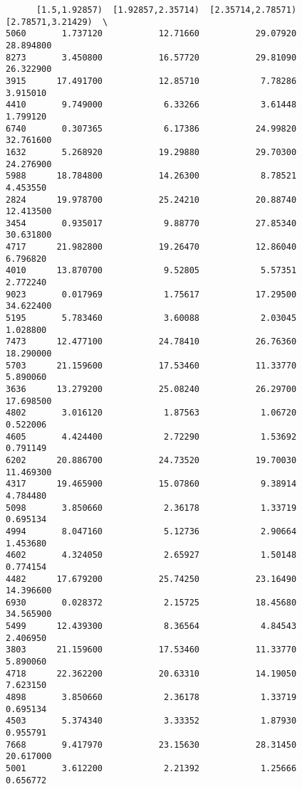 \documentclass[11pt]{article}
\begin{document}
\begin{verbatim}
      [1.5,1.92857)  [1.92857,2.35714)  [2.35714,2.78571)  [2.78571,3.21429)  \
5060       1.737120           12.71660           29.07920          28.894800   
8273       3.450800           16.57720           29.81090          26.322900   
3915      17.491700           12.85710            7.78286           3.915010   
4410       9.749000            6.33266            3.61448           1.799120   
6740       0.307365            6.17386           24.99820          32.761600   
1632       5.268920           19.29880           29.70300          24.276900   
5988      18.784800           14.26300            8.78521           4.453550   
2824      19.978700           25.24210           20.88740          12.413500   
3454       0.935017            9.88770           27.85340          30.631800   
4717      21.982800           19.26470           12.86040           6.796820   
4010      13.870700            9.52805            5.57351           2.772240   
9023       0.017969            1.75617           17.29500          34.622400   
5195       5.783460            3.60088            2.03045           1.028800   
7473      12.477100           24.78410           26.76360          18.290000   
5703      21.159600           17.53460           11.33770           5.890060   
3636      13.279200           25.08240           26.29700          17.698500   
4802       3.016120            1.87563            1.06720           0.522006   
4605       4.424400            2.72290            1.53692           0.791149   
6202      20.886700           24.73520           19.70030          11.469300   
4317      19.465900           15.07860            9.38914           4.784480   
5098       3.850660            2.36178            1.33719           0.695134   
4994       8.047160            5.12736            2.90664           1.453680   
4602       4.324050            2.65927            1.50148           0.774154   
4482      17.679200           25.74250           23.16490          14.396600   
6930       0.028372            2.15725           18.45680          34.565900   
5499      12.439300            8.36564            4.84543           2.406950   
3803      21.159600           17.53460           11.33770           5.890060   
4718      22.362200           20.63310           14.19050           7.623150   
4898       3.850660            2.36178            1.33719           0.695134   
4503       5.374340            3.33352            1.87930           0.955791   
7668       9.417970           23.15630           28.31450          20.617000   
5001       3.612200            2.21392            1.25666           0.656772   

\end{verbatim}
\end{document}
